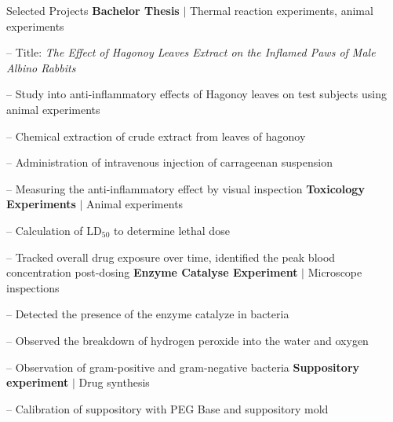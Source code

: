 
\begin{rubric}{\faTasks[solid]  Selected Projects}
\entry*[2015][]%
	\textbf{Bachelor Thesis } $|$ Thermal reaction experiments, animal experiments \par
	-- Title: \emph{The Effect of Hagonoy Leaves Extract on the Inflamed Paws of Male Albino Rabbits} \par
	-- Study into anti-inflammatory effects of Hagonoy leaves on test subjects using animal experiments \par
	-- Chemical extraction of crude extract from leaves of hagonoy \par
	-- Administration of intravenous injection of carrageenan suspension \par
	-- Measuring the anti-inflammatory effect by visual inspection 
%
\entry*[2015][] \textbf{Toxicology Experiments} $|$ Animal experiments \par
	-- Calculation of $\mathrm{LD}_{50}$ to determine lethal dose \par
	-- Tracked overall drug exposure over time, identified the peak blood concentration post-dosing 
%
\entry*[2014][] \textbf{Enzyme Catalyse Experiment} $|$ Microscope inspections  \par
	-- Detected the presence of the enzyme catalyze in bacteria \par
	-- Observed the breakdown of hydrogen peroxide into the water and oxygen\par
	-- Observation of gram-positive and gram-negative bacteria 
%
\entry*[2012][] \textbf{Suppository experiment } $|$ Drug synthesis  \par
	-- Calibration of suppository with PEG Base and suppository mold
\end{rubric}